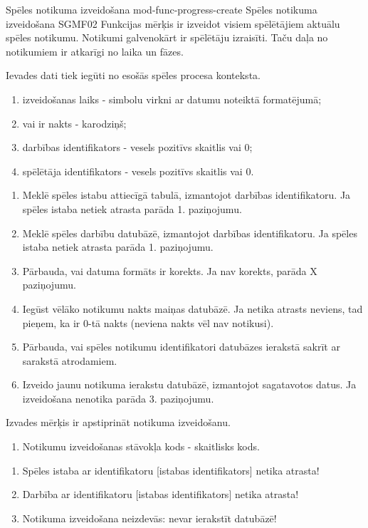 \moduleFunctionTable
{Spēles notikuma izveidošana}
{mod-func-progress-create}
{Spēles notikuma izveidošana}
{SGMF02}
{
	Funkcijas mērķis ir izveidot visiem spēlētājiem aktuālu spēles notikumu.
	Notikumi galvenokārt ir spēlētāju izraisīti.
	Taču daļa no notikumiem ir atkarīgi no laika un fāzes.
}
{
	Ievades dati tiek iegūti no esošās spēles procesa konteksta.
	\begin{enumerate}
		\item izveidošanas laiks - simbolu virkni ar datumu noteiktā formatējumā;
		\item vai ir nakts - karodziņš;
		\item darbības identifikators - vesels pozitīvs skaitlis vai 0;
		\item spēlētāja identifikators - vesels pozitīvs skaitlis vai 0.
	\end{enumerate}
}
{
	\begin{enumerate}
		\item Meklē spēles istabu attiecīgā tabulā, izmantojot darbības identifikatoru.
		      Ja spēles istaba netiek atrasta parāda 1. paziņojumu.
		\item Meklē spēles darbību datubāzē, izmantojot darbības identifikatoru.
		      Ja spēles istaba netiek atrasta parāda 1. paziņojumu.
		\item Pārbauda, vai datuma formāts ir korekts.
		      Ja nav korekts, parāda X paziņojumu.
		\item Iegūst vēlāko notikumu nakts maiņas datubāzē.
		      Ja netika atrasts neviens, tad pieņem, ka ir 0-tā nakts (neviena nakts vēl nav notikusi).
		\item Pārbauda, vai spēles notikumu identifikatori datubāzes ierakstā sakrīt ar sarakstā atrodamiem.
		\item Izveido jaunu notikuma ierakstu datubāzē, izmantojot sagatavotos datus.
		      Ja izveidošana nenotika parāda 3. paziņojumu.
	\end{enumerate}
}
{
	Izvades mērķis ir apstiprināt notikuma izveidošanu.
	\begin{enumerate}
		\item Notikumu izveidošanas stāvokļa kods - skaitlisks kods.
	\end{enumerate}
}
{
	\begin{enumerate}
		\item Spēles istaba ar identifikatoru [istabas identifikators] netika atrasta!
		\item Darbība ar identifikatoru [istabas identifikators] netika atrasta!
		\item Notikuma izveidošana neizdevās: nevar ierakstīt datubāzē!
	\end{enumerate}
}
